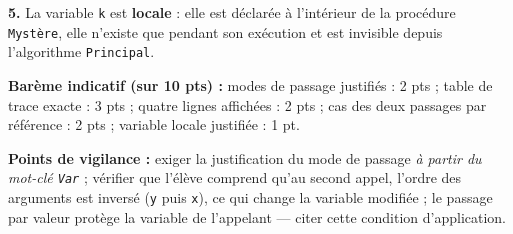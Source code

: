 \documentclass[11pt]{article}
\begin{document}
\begin{corrige}
\textbf{5.} La variable \texttt{k} est \textbf{locale} : elle est déclarée à l'intérieur de la procédure \texttt{Mystère}, elle n'existe que pendant son exécution et est invisible depuis l'algorithme \texttt{Principal}.

\medskip
\textbf{Barème indicatif (sur 10 pts) :} modes de passage justifiés : 2 pts ; table de trace exacte : 3 pts ; quatre lignes affichées : 2 pts ; cas des deux passages par référence : 2 pts ; variable locale justifiée : 1 pt.

\textbf{Points de vigilance :} exiger la justification du mode de passage \emph{à partir du mot-clé \texttt{Var}} ; vérifier que l'élève comprend qu'au second appel, l'ordre des arguments est inversé (\texttt{y} puis \texttt{x}), ce qui change la variable modifiée ; le passage par valeur protège la variable de l'appelant — citer cette condition d'application.
\end{corrige}
\end{document}
